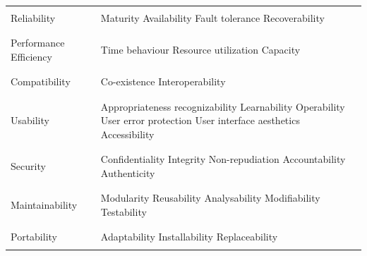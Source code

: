 \begin{longtable}{p{} | p{}}
    \hline
    \\
    Reliability &
    Maturity \newline
    Availability \newline
    Fault tolerance \newline
    Recoverability \\
    \\
    \hline
    \\
    Performance Efficiency &
    Time behaviour \newline
    Resource utilization \newline
    Capacity \\
    \\
    \hline
    \\
    Compatibility &
    Co-existence \newline
    Interoperability \\
    \\
    \hline
    \\
    Usability &
    Appropriateness recognizability \newline
    Learnability \newline
    Operability \newline
    User error protection \newline
    User interface aesthetics \newline
    Accessibility \\
    \\
    \hline
    \\
    Security &
    Confidentiality \newline
    Integrity \newline
    Non-repudiation \newline
    Accountability \newline
    Authenticity \\
    \\
    \hline
    \\
    Maintainability &
    Modularity \newline
    Reusability \newline
    Analysability \newline
    Modifiability \newline
    Testability \\
    \\
    \hline
    \\
    Portability &
    Adaptability \newline
    Installability \newline
    Replaceability \\
    \\
\end{longtable}


